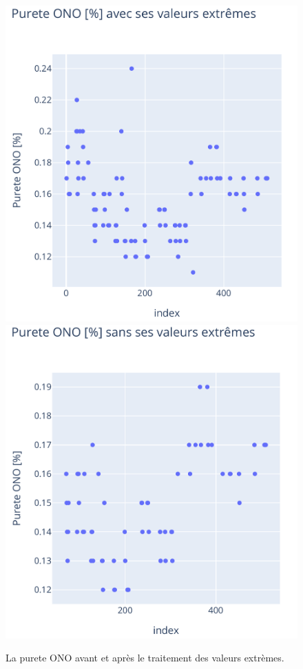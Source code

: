\documentclass[12pt]{article}
\begin{document}
\begin{figure}[H]
    \centering
    \begin{adjustbox}{width=1.3\textwidth,center}
        \includegraphics[scale=1]{Images/Statistique/Purete ONO_avec_extreme.pdf}
        \includegraphics[scale=1]{Images/Statistique/Purete ONO_sans_extreme.pdf}
    \end{adjustbox}
    \caption{La purete ONO avant et après le traitement des valeurs extrèmes.}
    \label{fig:ExtremeONO}
\end{figure}
\end{document}
